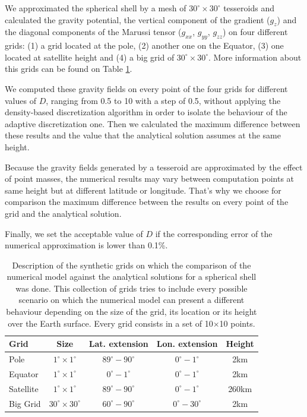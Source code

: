 \documentclass[extra]{gji}
\begin{document}
We approximated the spherical shell by a mesh of $30^\circ \times 30^\circ$ tesseroids and calculated the gravity potential, the vertical component of the gradient ($g_z$) and the diagonal components of the Marussi tensor ($g_{xx}$, $g_{yy}$, $g_{zz}$) on four different grids: (1) a grid located at the pole, (2) another one on the Equator, (3) one located at satellite height and (4) a big grid of $30^\circ \times 30^\circ$.
More information about this grids can be found on Table \ref{tab:grids}.

We computed these gravity fields on every point of the four grids for different values of $D$, ranging from 0.5 to 10 with a step of 0.5, without applying the density-based discretization algorithm in order to isolate the behaviour of the adaptive discretization one.
Then we calculated the maximum difference between these results and the value that the analytical solution assumes at the same height.

Because the gravity fields generated by a tesseroid are approximated by the effect of point masses, the numerical results may vary between computation points at same height but at different latitude or longitude.
That's why we choose for comparison the maximum difference between the results on every point of the grid and the analytical solution.

Finally, we set the acceptable value of $D$ if the corresponding error of the numerical approximation is lower than 0.1\%.

\begin{table}
\caption{
    Description of the synthetic grids on which the comparison of the numerical model against the analytical solutions for a spherical shell was done. This collection of grids tries to include every possible scenario on which the numerical model can present a different behaviour depending on the size of the grid, its location or its height over the Earth surface. Every grid consists in a set of 10$\times$10 points.
}
\label{tab:grids}
\begin{tabular}{lcccc}
    Grid & Size & Lat. extension & Lon. extension & Height \\ \hline
    Pole & $1^\circ \times 1^\circ$ & $89^\circ - 90^\circ$ & $0^\circ - 1^\circ$ & 2km \\
    Equator & $1^\circ \times 1^\circ$ & $0^\circ - 1^\circ$ & $0^\circ - 1^\circ$ & 2km \\
    Satellite & $1^\circ \times 1^\circ$ & $89^\circ - 90^\circ$ & $0^\circ - 1^\circ$ & 260km \\
    Big Grid & $30^\circ \times 30^\circ$ & $60^\circ - 90^\circ$ & $0^\circ - 30^\circ$ & 2km \\
\end{tabular}
\end{table}
\end{document}
